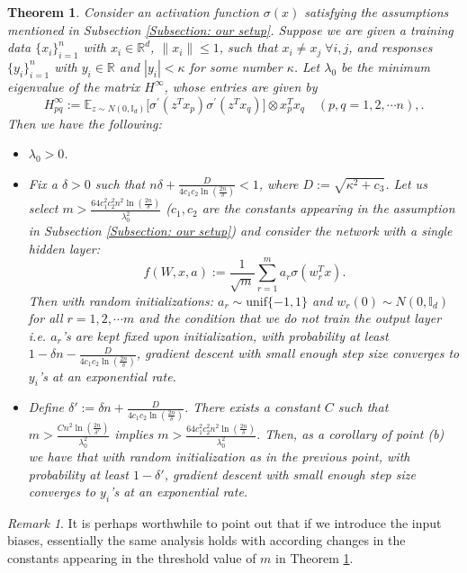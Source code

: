 \documentclass[a4paper,11pt]{amsart}
\newcommand{\IE}{\mathbb{E}}
\theoremstyle{definition}
\theoremstyle{plain}
\newtheorem{thm}[dfn]{Theorem}
\theoremstyle{remark}
\newtheorem{rmrk}[dfn]{Remark}
\newcommand{\IR}{\mathbb{R}}
\newcommand{\ot}{\otimes}
\begin{document}
\begin{thm}\label{Theorem: main result}
Consider an activation function $\sigma(x)$ satisfying the assumptions mentioned in Subsection \ref{Subsection: our setup}. 
Suppose we are given a training data $\{x_i\}_{i=1}^n$ with $x_i\in\IR^d$, $\|x_i\|\leq1$, such that $x_i \neq x_j \; \forall i,j$, and responses $\{y_i\}_{i=1}^n$ with $y_i\in\IR$ and $|y_i|<\kappa$ for some number $\kappa$. Let $\lambda_0$ be the minimum eigenvalue of the matrix $H^\infty$, whose entries are given by 
\[
H^\infty_{pq}:=\IE_{z\sim N(0,\mathbb{I}_d)}\Big[\sigma^\prime(z^Tx_p)\sigma^\prime(z^Tx_q)\Big]\ot x_p^Tx_q\quad(p,q=1,2,\cdots n),.
\]
Then we have the following:

\begin{itemize}

\item[(a)]
$\lambda_0>0$.

\item[(b)]
Fix a $\delta>0$ such that $n\delta+\frac{D}{4c_1c_2\ln(\frac{2n}{\delta})}<1$, where $D:=\sqrt{\kappa^2+c_3}$. 
Let us select $m>\frac{64c_1^2c_2^2n^2\ln(\frac{2n}{\delta})}{\lambda_0^2}$ ($c_1,c_2$ are the constants appearing in the assumption in Subsection \ref{Subsection: our setup}) and consider the network with a single hidden layer:\[f(W,x,a):=\frac{1}{\sqrt{m}}\sum_{r=1}^m a_r\sigma(w_r^Tx).\]
Then with random initializations: $a_r\sim\text{unif}\{-1,1\}$ and $w_r(0)\sim N(0,\mathbb{I}_d)$ for all $r=1,2,\cdots m$ and the condition that we do not train the output layer i.e. $a_r$'s are kept fixed upon initialization, with probability at least $1-\delta n-\frac{D}{4c_1c_2\ln(\frac{2n}{\delta})}$, gradient descent with small enough step size converges to $y_i$'s at an exponential rate.

\item[(c)]
Define $\delta' := \delta n+\frac{D}{4c_1c_2\ln(\frac{2n}{\delta})}$.
There exists a constant $C$ such that $m > \frac{C n^2\ln(\frac{2n}{\delta'})}{\lambda_0^2}$ implies $m>\frac{64c_1^2c_2^2n^2\ln(\frac{2n}{\delta})}{\lambda_0^2}$.
Then, as a corollary of point (b) we have that with random initialization as in the previous point, with probability at least $1-\delta'$, gradient descent with small enough step size converges to $y_i$'s at an exponential rate.

\end{itemize}
\end{thm}

\begin{rmrk}
It is perhaps worthwhile to point out that if we introduce the input biases, essentially the same analysis holds with according changes in the constants appearing in the threshold value of $m$ in Theorem \ref{Theorem: main result}.
\end{rmrk}
\end{document}

